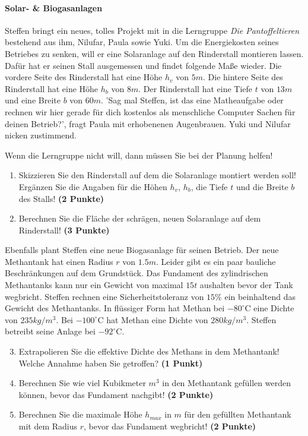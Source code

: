 \documentclass[a4paper, 9pt]{scrartcl}\usepackage[]{graphicx}\usepackage[]{xcolor}
\begin{document}
\ifcollection
\paragraph{Solar- \& Biogasanlagen}
\fi



Steffen bringt ein neues, tolles Projekt mit in die Lerngruppe \textit{Die Pantoffeltieren} bestehend aus ihm, Nilufar, Paula sowie Yuki. Um die Energiekosten seines Betriebes zu senken, will er eine Solaranlage auf den Rinderstall montieren lassen. Dafür hat er seinen Stall ausgemessen und findet folgende Maße wieder. Die vordere Seite des Rinderstall hat eine Höhe $h_v$ von $5m$. Die hintere Seite des Rinderstall hat eine Höhe $h_b$ von $8m$. Der Rinderstall hat eine Tiefe $t$ von $13m$ und eine Breite $b$ von $60m$. 'Sag mal Steffen, ist das eine Matheaufgabe oder rechnen wir hier gerade für dich kostenlos als menschliche Computer Sachen für deinen Betrieb?', fragt Paula mit erhobenenen Augenbrauen. Yuki und Nilufar nicken zustimmend.

\vspace{1Ex}

Wenn die Lerngruppe nicht will, dann müssen Sie bei der Planung helfen!

\begin{enumerate}
\item Skizzieren Sie den Rinderstall auf dem die Solaranlage montiert werden soll! Ergänzen Sie die Angaben für die Höhen $h_v$, $h_b$, die Tiefe $t$ und die Breite $b$ des Stalls!  \textbf{(2 Punkte)}
\item Berechnen Sie die Fläche der schrägen, neuen Solaranlage auf dem Rinderstall! \textbf{(3 Punkte)}
\end{enumerate}

Ebenfalls plant Steffen eine neue Biogasanlage für seinen Betrieb. Der neue Methantank hat einen Radius $r$ von $1.5m$. Leider gibt es ein paar bauliche Beschränkungen auf dem Grundstück. Das Fundament des zylindrischen Methantanks kann nur ein Gewicht von maximal $15t$ aushalten bevor der Tank wegbricht. Steffen rechnen eine Sicherheitstoleranz von $15\%$ ein beinhaltend das Gewicht des Methantanks. In flüssiger Form hat Methan bei $-80^\circ\text{C}$ eine Dichte von $235kg/m^3$. Bei $-100^\circ\text{C}$ hat Methan eine Dichte von $280kg/m^3$. Steffen betreibt seine Anlage bei $-92^\circ\text{C}$.

\begin{enumerate}
  \setcounter{enumi}{2}
\item Extrapolieren Sie die effektive Dichte des Methans in dem Methantank! Welche Annahme haben Sie getroffen? \textbf{(1 Punkt)}
\item Berechnen Sie wie viel Kubikmeter $m^3$ in den Methantank gefüllen werden können, bevor das Fundament nachgibt! \textbf{(2 Punkte)}
\item Berechnen Sie die maximale Höhe $h_{max}$ in $m$ für den gefüllten Methantank mit dem Radius $r$, bevor das Fundament wegbricht! \textbf{(2 Punkte)}
\end{enumerate}
\end{document}
